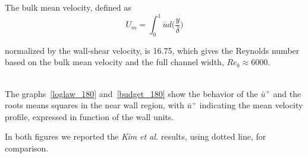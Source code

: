 The bulk mean velocity, defined as 
\begin{equation*}
U_{m} = \int_{0}^{1} \bar{u}d \big(\frac{y}{\delta} \big)
\end{equation*}

normalized by the wall-shear velocity, is 16.75, which gives the Reynolds number based on the bulk mean velocity and the full channel width, $Re_{b}\approx 6000$. \\~\par
The graphs~\ref{loglaw_180} and~\ref{budget_180} show the behavior of the $\bar{u}^{+}$ and the roots means squares in the near wall region, with $\bar{u}^{+}$ indicating the mean velocity profile, expressed in function of the wall units. \par
In both figures we reported the \emph{Kim et al.} results, using dotted line, for comparison. \\~\par

